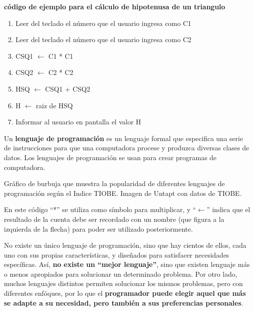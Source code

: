 \begin{example}
    \textbf{código de ejemplo para el cálculo de hipotenusa de un triangulo}

    \begin{enumerate}
        \item Leer del teclado el número que el usuario ingresa como C1
        \item Leer del teclado el número que el usuario ingresa como C2
        \item CSQ1 $\leftarrow$ C1 * C1
        \item CSQ2 $\leftarrow$ C2 * C2
        \item HSQ $\leftarrow$ CSQ1 + CSQ2
        \item H $\leftarrow$ raiz de HSQ
        \item Informar al usuario en pantalla el valor H
    \end{enumerate}
\end{example}

\begin{definition}
    Un \textbf{lenguaje de programación} es un lenguaje formal que especifica
    una serie de instrucciones para que una computadora procese y produzca diversas
    clases de datos. Los lenguajes de programación se usan para crear programas
    de computadora.\autocite{sebesta_2005}
\end{definition}

{Gráfico de burbuja que muestra la popularidad de diferentes lenguajes de programación
según el Indice TIOBE.}
{Imagen de Untapt con datos de TIOBE.}

En este código ``*'' se utiliza como símbolo para multiplicar, y ``$\leftarrow$''
indica que el resultado de la cuenta debe ser recordado con un nombre (que
figura a la izquierda de la flecha) para poder ser utilizado posteriormente.

No existe un único lenguaje de programación, sino que hay cientos de ellos, cada
uno con sus propias características, y diseñados para satisfacer necesidades
específicas. Así, \textbf{no existe un ``mejor lenguaje''}, sino que existen lenguaje
más o menos apropiados para solucionar un determinado problema. Por otro lado, muchos
lenguajes distintos permiten solucionar los mismos problemas, pero con diferentes
enfóques, por lo que el \textbf{programador puede elegir aquel que más se adapte a su
necesidad, pero también a sus preferencias personales}.

